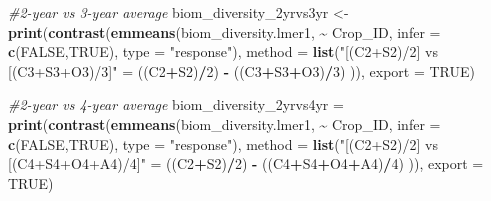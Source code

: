 \documentclass[
]{article}
\newenvironment{Shaded}{\begin{snugshade}}{\end{snugshade}}
\newcommand{\AttributeTok}[1]{\textcolor[rgb]{0.13,0.29,0.53}{#1}}
\newcommand{\CommentTok}[1]{\textcolor[rgb]{0.56,0.35,0.01}{\textit{#1}}}
\newcommand{\ConstantTok}[1]{\textcolor[rgb]{0.56,0.35,0.01}{#1}}
\newcommand{\DecValTok}[1]{\textcolor[rgb]{0.00,0.00,0.81}{#1}}
\newcommand{\FunctionTok}[1]{\textcolor[rgb]{0.13,0.29,0.53}{\textbf{#1}}}
\newcommand{\NormalTok}[1]{#1}
\newcommand{\OtherTok}[1]{\textcolor[rgb]{0.56,0.35,0.01}{#1}}
\newcommand{\SpecialCharTok}[1]{\textcolor[rgb]{0.81,0.36,0.00}{\textbf{#1}}}
\newcommand{\StringTok}[1]{\textcolor[rgb]{0.31,0.60,0.02}{#1}}
\begin{document}
\begin{Shaded}
\begin{Highlighting}[]
\CommentTok{\#2{-}year vs 3{-}year average}
\NormalTok{biom\_diversity\_2yrvs3yr }\OtherTok{\textless{}{-}} \FunctionTok{print}\NormalTok{(}\FunctionTok{contrast}\NormalTok{(}\FunctionTok{emmeans}\NormalTok{(biom\_diversity.lmer1, }\SpecialCharTok{\textasciitilde{}}\NormalTok{ Crop\_ID,}
                                                  \AttributeTok{infer =} \FunctionTok{c}\NormalTok{(}\ConstantTok{FALSE}\NormalTok{,}\ConstantTok{TRUE}\NormalTok{),}
                                                  \AttributeTok{type =} \StringTok{"response"}\NormalTok{),}
                                          \AttributeTok{method =} \FunctionTok{list}\NormalTok{(}\StringTok{"[(C2+S2)/2] vs [(C3+S3+O3)/3]"} \OtherTok{=} 
\NormalTok{                                                          ((C2}\SpecialCharTok{+}\NormalTok{S2)}\SpecialCharTok{/}\DecValTok{2}\NormalTok{) }\SpecialCharTok{{-}}\NormalTok{ ((C3}\SpecialCharTok{+}\NormalTok{S3}\SpecialCharTok{+}\NormalTok{O3)}\SpecialCharTok{/}\DecValTok{3}\NormalTok{) )), }
                                 \AttributeTok{export =} \ConstantTok{TRUE}\NormalTok{)}

\CommentTok{\#2{-}year vs 4{-}year average}
\NormalTok{biom\_diversity\_2yrvs4yr }\OtherTok{=} \FunctionTok{print}\NormalTok{(}\FunctionTok{contrast}\NormalTok{(}\FunctionTok{emmeans}\NormalTok{(biom\_diversity.lmer1, }\SpecialCharTok{\textasciitilde{}}\NormalTok{ Crop\_ID, }
                                                 \AttributeTok{infer =} \FunctionTok{c}\NormalTok{(}\ConstantTok{FALSE}\NormalTok{,}\ConstantTok{TRUE}\NormalTok{), }
                                                 \AttributeTok{type =} \StringTok{"response"}\NormalTok{),}
                                         \AttributeTok{method =} \FunctionTok{list}\NormalTok{(}\StringTok{"[(C2+S2)/2] vs [(C4+S4+O4+A4)/4]"} \OtherTok{=}
\NormalTok{                                                         ((C2}\SpecialCharTok{+}\NormalTok{S2)}\SpecialCharTok{/}\DecValTok{2}\NormalTok{) }\SpecialCharTok{{-}}\NormalTok{ ((C4}\SpecialCharTok{+}\NormalTok{S4}\SpecialCharTok{+}\NormalTok{O4}\SpecialCharTok{+}\NormalTok{A4)}\SpecialCharTok{/}\DecValTok{4}\NormalTok{) )),}
                                \AttributeTok{export =} \ConstantTok{TRUE}\NormalTok{)}


\end{Highlighting}
\end{Shaded}
\end{document}
